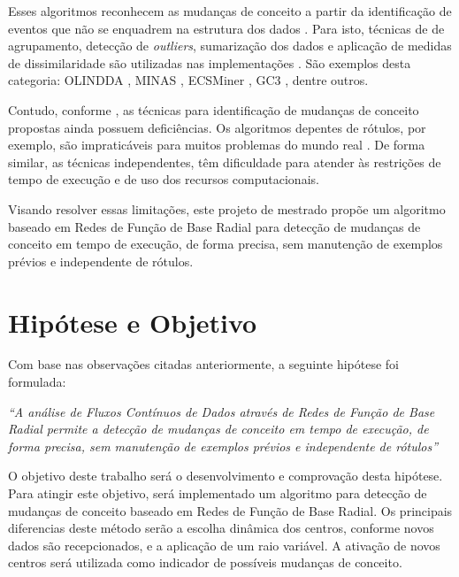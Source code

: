\documentclass[qual, classic, a4paper]{ufbathesis}
\begin{document}
Esses algoritmos reconhecem as mudanças de conceito a partir da identificação de eventos que não se enquadrem na estrutura dos dados \cite{Spinosa:2007:OCA:1244002.1244107}.
Para isto, técnicas de de agrupamento, detecção de \textit{outliers}, sumarização dos dados e aplicação de medidas de dissimilaridade são utilizadas nas implementações \cite{Ryu:Kantardzic:2012}.
São exemplos desta categoria:
OLINDDA \cite{Spinosa:2007:OCA:1244002.1244107},
MINAS \cite{Faria:2013:NDA:2480362.2480515},
ECSMiner \cite{Masud:2011:CNC:1978259.1978529},
GC3 \cite{Sethi2016b:GC3}, dentre outros.

Contudo, conforme \cite{Aggarwal:2006:DSM:1196418}, as técnicas para identificação de mudanças de conceito propostas ainda possuem deficiências.
Os algoritmos depentes de rótulos, por exemplo, são impraticáveis para muitos problemas do mundo real \cite{Gama:2014:SCD:2597757.2523813}.
De forma similar, as técnicas independentes, têm dificuldade para atender às restrições de tempo de execução e de uso dos recursos computacionais.

Visando resolver essas limitações, este projeto de mestrado propõe um algoritmo baseado em Redes de Função de Base Radial para detecção de mudanças de conceito em tempo de execução, de forma precisa, sem manutenção de exemplos prévios e independente de rótulos.

\section{Hipótese e Objetivo}

Com base nas observações citadas anteriormente, a seguinte hipótese foi formulada:

\begin{center}
\textit{``A análise de Fluxos Contínuos de Dados através de Redes de Função de Base Radial permite a detecção de mudanças de conceito em tempo de execução, de forma precisa, sem manutenção de exemplos prévios e independente de rótulos''}
\end{center}

O objetivo deste trabalho será o desenvolvimento e comprovação desta hipótese.
Para atingir este objetivo, será implementado um algoritmo para detecção de mudanças de conceito baseado em Redes de Função de Base Radial. 
Os principais diferencias deste método serão a escolha dinâmica dos centros, conforme novos dados são recepcionados, e a aplicação de um raio variável.
A ativação de novos centros será utilizada como indicador de possíveis mudanças de conceito.
\end{document}
